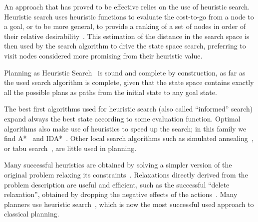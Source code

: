 An approach that has  proved to be effective relies on the use of heuristic
search. Heuristic search uses
heuristic functions to evaluate the cost-to-go from a node to a goal, or to be more general, to provide a ranking of a set of nodes
in order of their relative desirability~\citep[chap.9]{planning:book}.
%
This estimation of the distance in the search space is then used by
the search algorithm to drive the state space search, preferring to
visit nodes considered more promising from their heuristic value.


Planning as Heuristic Search~\citep{bonet:aij-hsp} is sound and complete by construction, as far as the
used search algorithm is complete, given that the state space contains exactly all the
possible plans as paths from the initial state to any goal state.

The best first algorithms used for heuristic search  (also called ``informed''
search)  expand always the best state according to some evaluation
function.  Optimal algorithms also make use of heuristics to speed up
the search; in this family we find A*~\citep{hart:astar} and
IDA*~\citep{korf:ida}.
%
Other local search algorithms such as simulated
annealing~\citep{kirk:simulated, cerny:simulated}, or tabu
search~\citep{glover:tabu1, glover:tabu2}, are little used in
planning.
%

Many successful heuristics are obtained by solving a simpler version
of the original problem %
relaxing its constraints~\citep{pearl:heuristics}.
%
Relaxations directly derived from the problem description are useful
and efficient, such as the successful ``delete relaxation'', obtained by
dropping the negative effects of the actions~\citep{hoffmann:ff}.
%
%
%
Many planners use heuristic search~\citep{mcdermott:unpop,bonet:asp},
 which is now 
the most successful used approach to classical planning. 


